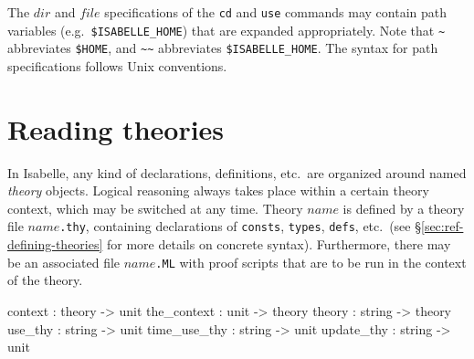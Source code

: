 The $dir$ and $file$ specifications of the \texttt{cd} and \texttt{use}
commands may contain path variables (e.g.\ \texttt{\$ISABELLE_HOME}) that are
expanded appropriately.  Note that \texttt{\~\relax} abbreviates
\texttt{\$HOME}, and \texttt{\~\relax\~\relax} abbreviates
\texttt{\$ISABELLE_HOME}.  The syntax for path
specifications follows Unix conventions.


\section{Reading theories}\label{sec:intro-theories}

In Isabelle, any kind of declarations, definitions, etc.\ are organized around
named \emph{theory} objects.  Logical reasoning always takes place within a
certain theory context, which may be switched at any time.  Theory $name$ is
defined by a theory file $name$\texttt{.thy}, containing declarations of
\texttt{consts}, \texttt{types}, \texttt{defs}, etc.\ (see
\S\ref{sec:ref-defining-theories} for more details on concrete syntax).
Furthermore, there may be an associated {\ML} file $name$\texttt{.ML} with
proof scripts that are to be run in the context of the theory.

\begin{ttbox}
context      : theory -> unit
the_context  : unit -> theory
theory       : string -> theory
use_thy      : string -> unit
time_use_thy : string -> unit
update_thy   : string -> unit
\end{ttbox}

